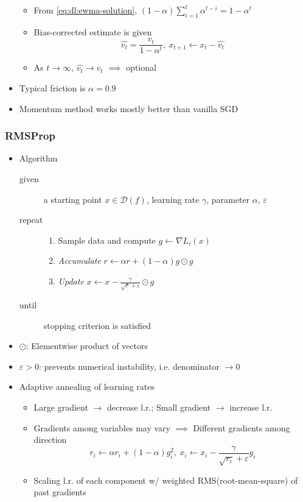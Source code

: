 \begin{itemize}
\begin{itemize}
        \item From \ref{eq:dl:ewma-solution}, $(1-\alpha)\sum_{i=1}^t\alpha^{t-i}=1-\alpha^t$
        \item Bias-corrected estimate is given
        \begin{equation}
            \hat{v_t}=\frac{v_t}{1-\alpha^t},~x_{t+1}\leftarrow x_t-\hat{v_t}
        \end{equation}
        \item As $t\to\infty$, $\hat{v_t}\to v_t$ $\implies$ optional
    \end{itemize}
    \item Typical friction is $\alpha=0.9$
    \item Momentum method works mostly better than vanilla SGD
\end{itemize}

\subsubsection*{RMSProp}
\begin{itemize}
    \item Algorithm
    \begin{description}
        \item[given] a starting point $x\in\mathcal{D}(f)$, learning rate $\gamma$, parameter $\alpha$, $\varepsilon$
        \item[repeat] \phantom{}
        \begin{enumerate}
            \item Sample data and compute $g\leftarrow\nabla L_i(x)$
            \item \textit{Accumulate} $r\leftarrow\alpha r+(1-\alpha)g\odot g$
            \item \textit{Update} $x\leftarrow x-\frac{\gamma}{\sqrt{r}+\varepsilon}\odot g$
        \end{enumerate}
        \item[until] stopping criterion is satisfied
    \end{description}
    \item $\odot$: Elementwise product of vectors
    \item $\varepsilon>0$: prevents numerical instability, i.e. denominator $\to 0$
    \item Adaptive annealing of learning rates
    \begin{itemize}
        \item Large gradient $\to$ decrease l.r.; Small gradient $\to$ increase l.r.
        \item Gradients among variables may vary $\implies$ Different gradients among direction
        \begin{equation}
            r_i\leftarrow\alpha r_i+(1-\alpha)g_i^2,~x_i\leftarrow x_i-\frac{\gamma}{\sqrt{r_i}+\varepsilon}g_i
        \end{equation}
        \item Scaling l.r. of each component w/ weighted RMS(root-mean-square) of past gradients
    \end{itemize}
\end{itemize}
